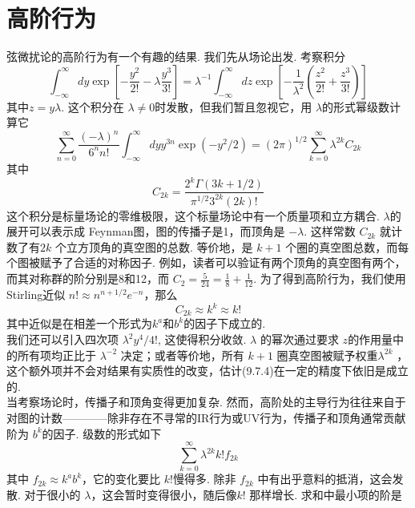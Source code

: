 \section{高阶行为}%
弦微扰论的高阶行为有一个有趣的结果. 我们先从场论出发. 考察积分
\begin{equation}
	\int_{-\infty}^{\infty} d y \exp \left[-\frac{y^{2}}{2 !}-\lambda \frac{y^{3}}{3 !}\right]=\lambda^{-1} \int_{-\infty}^{\infty} d z \exp \left[-\frac{1}{\lambda^{2}}\left(\frac{z^{2}}{2 !}+\frac{z^{3}}{3 !}\right)\right]
\end{equation}
其中$z=y \lambda $. 这个积分在 $\lambda \neq 0$时发散，但我们暂且忽视它，用 $\lambda$的形式幂级数计算它
\begin{equation}
	\sum_{n=0}^{\infty} \frac{(-\lambda)^{n}}{6^{n} n !} \int_{-\infty}^{\infty} d y y^{3 n} \exp \left(-y^{2} / 2\right)=(2 \pi)^{1 / 2} \sum_{k=0}^{\infty} \lambda^{2 k} C_{2 k}
\end{equation}
其中
\begin{equation}
	C_{2 k}=\frac{2^{k} \Gamma(3 k+1 / 2)}{\pi^{1 / 2} 3^{2 k}(2 k) !}
\end{equation}
这个积分是标量场论的零维极限，这个标量场论中有一个质量项和立方耦合. $\lambda$的展开可以表示成 Feynman图，图的传播子是1，而顶角是 $-\lambda$. 这样常数 $C_{2 k}$ 就计数了有$2 k$ 个立方顶角的真空图的总数. 等价地，是 $k+1$ 个圈的真空图总数，而每个图被赋予了合适的对称因子. 例如，读者可以验证有两个顶角的真空图有两个，而其对称群的阶分别是8和12，而 $C_{2}=\frac{5}{24}=\frac{1}{8}+\frac{1}{12}$. 为了得到高阶行为，我们使用Stirling近似 $n ! \approx n^{n+1 / 2} e^{-n}$，那么
\begin{equation}
	C_{2 k} \approx k^{k} \approx k !
\end{equation}
其中近似是在相差一个形式为$k^{a}$和$b^{k}$的因子下成立的.\\
我们还可以引入四次项 $\lambda^{2} y^{4} / 4 !$, 这使得积分收敛.  $\lambda$ 的幂次通过要求 $z$的作用量中的所有项均正比于 $\lambda^{-2} $ 决定；或者等价地，所有 $k+1$ 圈真空图被赋予权重$\lambda^{2 k} $ ，这个额外项并不会对结果有实质性的改变，估计(9.7.4)在一定的精度下依旧是成立的.\\
当考察场论时，传播子和顶角变得更加复杂. 然而，高阶处的主导行为往往来自于对图的计数————除非存在不寻常的IR行为或UV行为，传播子和顶角通常贡献阶为 $b^{k}$的因子. 级数的形式如下
\begin{equation}
	\sum_{k=0}^{\infty} \lambda^{2 k} k ! f_{2 k}
\end{equation}
其中 $f_{2 k} \approx k^{a} b^{k}$，它的变化要比 $k !$慢得多. 除非 $f_{2 k}$ 中有出乎意料的抵消，这会发散. 对于很小的 $\lambda$，这会暂时变得很小，随后像$k !$ 那样增长. 求和中最小项的阶是
